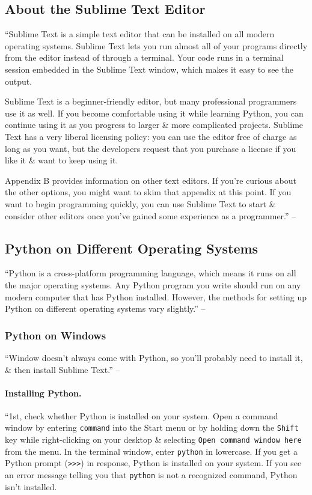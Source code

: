 \documentclass[oneside]{book}
\numberwithin{equation}{section}
\begin{document}
\subsection{About the Sublime Text Editor}
``Sublime Text is a simple text editor that can be installed on all modern operating systems. Sublime Text lets you run almost all of your programs directly from the editor instead of through a terminal. Your code runs in a terminal session embedded in the Sublime Text window, which makes it easy to see the output.

Sublime Text is a beginner-friendly editor, but many professional programmers use it as well. If you become comfortable using it while learning Python, you can continue using it as you progress to larger \& more complicated projects. Sublime Text has a very liberal licensing policy: you can use the editor free of charge as long as you want, but the developers request that you purchase a license if you like it \& want to keep using it.

Appendix B provides information on other text editors. If you're curious about the other options, you might want to skim that appendix at this point. If you want to begin programming quickly, you can use Sublime Text to start \& consider other editors once you've gained some experience as a programmer.'' -- \cite[pp. 4--5]{Matthes2019}

\subsection{Python on Different Operating Systems}
``Python is a cross-platform programming language, which means it runs on all the major operating systems. Any Python program you write should run on any modern computer that has Python installed. However, the methods for setting up Python on different operating systems vary slightly.'' -- \cite[p. 5]{Matthes2019}

\subsubsection{Python on Windows}
``Window doesn't always come with Python, so you'll probably need to install it, \& then install Sublime Text.'' -- \cite[p. 5]{Matthes2019}

\paragraph{Installing Python.} ``1st, check whether Python is installed on your system. Open a command window by entering \texttt{command} into the Start menu or by holding down the \texttt{Shift} key while right-clicking on your desktop \& selecting \texttt{Open command window here} from the menu. In the terminal window, enter \texttt{python} in lowercase. If you get a Python prompt (\texttt{>>>}) in response, Python is installed on your system. If you see an error message telling you that \texttt{python} is not a recognized command, Python isn't installed.
\end{document}
